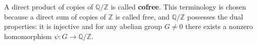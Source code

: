 A direct product of copies of $\mathbb{Q}/\mathbb{Z}$ is called \textbf{cofree}. This terminology is chosen because a direct sum of copies of $\mathbb{Z}$ is called free, and $\mathbb{Q}/\mathbb{Z}$ possesses the dual properties: it is injective and for any abelian group $G \neq 0$ there exists a nonzero homomorphism $\psi : G \rightarrow \mathbb{Q}/\mathbb{Z}$.

